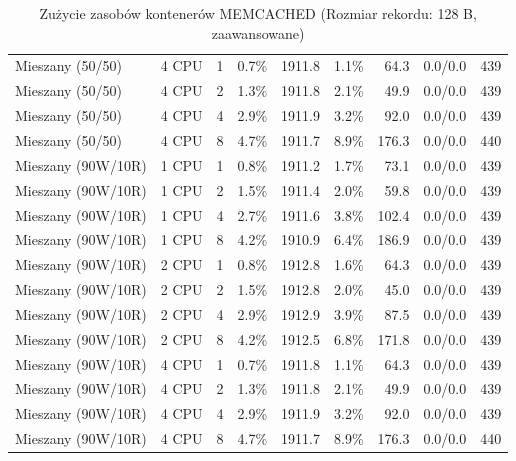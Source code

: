 \begin{table}[ht]
{\begin{tabular}{llcrrrrcc}
Mieszany (50/50) & 4 CPU & 1 & 0.7\% & 1911.8 & 1.1\% & 64.3 & 0.0/0.0 & 439 \\
Mieszany (50/50) & 4 CPU & 2 & 1.3\% & 1911.8 & 2.1\% & 49.9 & 0.0/0.0 & 439 \\
Mieszany (50/50) & 4 CPU & 4 & 2.9\% & 1911.9 & 3.2\% & 92.0 & 0.0/0.0 & 439 \\
Mieszany (50/50) & 4 CPU & 8 & 4.7\% & 1911.7 & 8.9\% & 176.3 & 0.0/0.0 & 440 \\
Mieszany (90W/10R) & 1 CPU & 1 & 0.8\% & 1911.2 & 1.7\% & 73.1 & 0.0/0.0 & 439 \\
Mieszany (90W/10R) & 1 CPU & 2 & 1.5\% & 1911.4 & 2.0\% & 59.8 & 0.0/0.0 & 439 \\
Mieszany (90W/10R) & 1 CPU & 4 & 2.7\% & 1911.6 & 3.8\% & 102.4 & 0.0/0.0 & 439 \\
Mieszany (90W/10R) & 1 CPU & 8 & 4.2\% & 1910.9 & 6.4\% & 186.9 & 0.0/0.0 & 439 \\
Mieszany (90W/10R) & 2 CPU & 1 & 0.8\% & 1912.8 & 1.6\% & 64.3 & 0.0/0.0 & 439 \\
Mieszany (90W/10R) & 2 CPU & 2 & 1.5\% & 1912.8 & 2.0\% & 45.0 & 0.0/0.0 & 439 \\
Mieszany (90W/10R) & 2 CPU & 4 & 2.9\% & 1912.9 & 3.9\% & 87.5 & 0.0/0.0 & 439 \\
Mieszany (90W/10R) & 2 CPU & 8 & 4.2\% & 1912.5 & 6.8\% & 171.8 & 0.0/0.0 & 439 \\
Mieszany (90W/10R) & 4 CPU & 1 & 0.7\% & 1911.8 & 1.1\% & 64.3 & 0.0/0.0 & 439 \\
Mieszany (90W/10R) & 4 CPU & 2 & 1.3\% & 1911.8 & 2.1\% & 49.9 & 0.0/0.0 & 439 \\
Mieszany (90W/10R) & 4 CPU & 4 & 2.9\% & 1911.9 & 3.2\% & 92.0 & 0.0/0.0 & 439 \\
Mieszany (90W/10R) & 4 CPU & 8 & 4.7\% & 1911.7 & 8.9\% & 176.3 & 0.0/0.0 & 440 \\
\bottomrule
\end{tabular}%
}
\caption{Zużycie zasobów kontenerów MEMCACHED (Rozmiar rekordu: 128 B, zaawansowane)}
\label{tab:resources_memcached_small_0}
\end{table}
